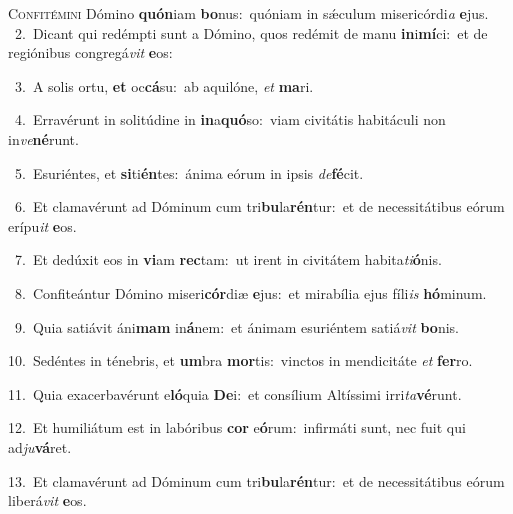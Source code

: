 \lettrine{\initial\textcolor{\initialcolor}{C}}{onfitémini} Dómino \textbf{quón}\-iam \textbf{bo}\-nus:~\star quóniam in sǽculum misericórdi\textit{a} \textbf{e}\-jus.\\
{\numbfont\textcolor{\numbcolor}{~2.}}~Dicant qui redémpti sunt a Dómino, quos redémit de manu \textbf{in}\-i\-\textbf{mí}\-ci:~\star et de regiónibus congregá\textit{vit} \textbf{e}\-os:\par
{\numbfont\textcolor{\numbcolor}{~3.}}~A solis ortu, \textbf{et} oc\-\textbf{cá}\-su:~\star ab aquilóne, \textit{et} \textbf{ma}\-ri.\par
{\numbfont\textcolor{\numbcolor}{~4.}}~Erravérunt in solitúdine in \textbf{in}\-a\-\textbf{quó}\-so:~\star viam civitátis habitáculi non in\-\textit{ve}\-\textbf{né}runt.\par
{\numbfont\textcolor{\numbcolor}{~5.}}~Esuriéntes, et \textbf{si}\-ti\-\textbf{én}\-tes:~\star ánima eórum in ipsis \textit{de}\-\textbf{fé}cit.\par
{\numbfont\textcolor{\numbcolor}{~6.}}~Et clamavérunt ad Dóminum cum tri\-\textbf{bu}\-la\-\textbf{rén}\-tur:~\star et de necessitátibus eórum erípu\textit{it} \textbf{e}\-os.\par
{\numbfont\textcolor{\numbcolor}{~7.}}~Et dedúxit eos in \textbf{vi}\-am \textbf{rec}\-tam:~\star ut irent in civitátem habita\-\textit{ti}\-\textbf{ó}nis.\par
{\numbfont\textcolor{\numbcolor}{~8.}}~Confiteántur Dómino miseri\-\textbf{cór}\-diæ \textbf{e}\-jus:~\star et mirabília ejus fíli\textit{is} \textbf{hó}\-minum.\par
{\numbfont\textcolor{\numbcolor}{~9.}}~Quia satiávit áni\textbf{mam} in\-\textbf{á}\-nem:~\star et ánimam esuriéntem satiá\textit{vit} \textbf{bo}\-nis.\par
{\numbfont\textcolor{\numbcolor}{10.}}~Sedéntes in ténebris, et \textbf{um}\-bra \textbf{mor}\-tis:~\star vinctos in mendicitáte \textit{et} \textbf{fer}\-ro.\par
{\numbfont\textcolor{\numbcolor}{11.}}~Quia exacerbavérunt e\-\textbf{ló}\-quia \textbf{De}\-i:~\star et consílium Altíssimi irri\-\textit{ta}\-\textbf{vé}runt.\par
{\numbfont\textcolor{\numbcolor}{12.}}~Et humiliátum est in labóribus \textbf{cor} e\-\textbf{ó}\-rum:~\star infirmáti sunt, nec fuit qui ad\-\textit{ju}\-\textbf{vá}ret.\par
{\numbfont\textcolor{\numbcolor}{13.}}~Et clamavérunt ad Dóminum cum tri\-\textbf{bu}\-la\-\textbf{rén}\-tur:~\star et de necessitátibus eórum liberá\textit{vit} \textbf{e}\-os.\par
